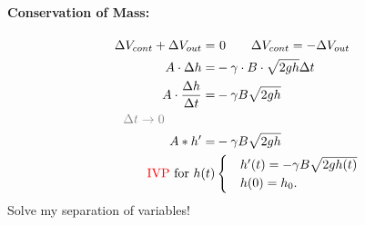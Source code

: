 \documentclass[]{article}
\begin{document}
	\paragraph{Conservation of Mass:} 
	\[
		\begin{split}
			\Delta V_{cont}+\Delta V_{out} = &~ 0\quad\quad \Delta V_{cont}=-\Delta V_{out}  \\
			A \cdot \Delta h = & -\gamma \cdot B \cdot \sqrt{2gh}\Delta t\\
			A \cdot \frac{\Delta h}{\Delta t} = & -\gamma B\sqrt{2gh}\\
			\text{ \textcolor{gray}{$\Delta t\to 0$}}\quad\quad\quad\quad &\\
			A*h' = & -\gamma B\sqrt{2gh}\\
			\text{ \textcolor{red}{IVP} for }h(t) &
			\begin{cases} 
				 & h'(t)=-\gamma B\sqrt{2gh(t)} \\
				 & h(0)=h_0.
			\end{cases}
		\end{split}
	\]
	Solve my separation of variables!
\end{document}
